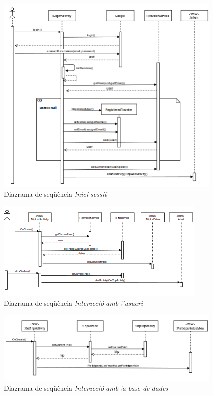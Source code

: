\begin{figure}[!h]
\centering
\includegraphics[scale=1.2]{Figures/logInDS.png}
\caption{Diagrama de seqüència \textit{Inici sessió}}
\end{figure}

\begin{figure}[!h]
\centering
\includegraphics[scale=1.2]{Figures/tripListDS.png}
\caption{Diagrama de seqüència \textit{Interacció amb l'usuari}}
\end{figure}

\begin{figure}[!h]
\centering
\includegraphics[scale=1.2]{Figures/accesBDDS.png}
\caption{Diagrama de seqüència \textit{Interacció amb la base de dades}}
\end{figure}



